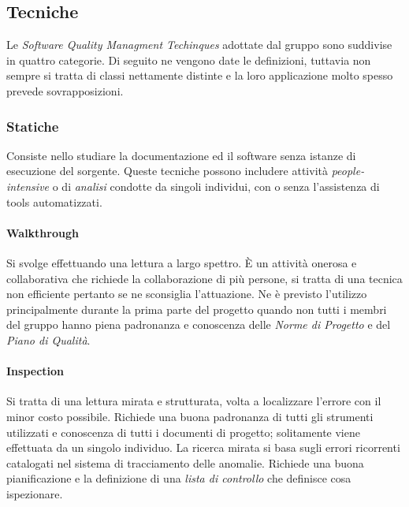 	\subsection{Tecniche}
	Le \emph{Software Quality Managment Techinques} adottate dal gruppo sono suddivise in quattro categorie. Di seguito ne vengono date le definizioni, tuttavia non sempre si tratta di classi nettamente distinte e la loro applicazione molto spesso prevede sovrapposizioni.
	
		\subsubsection{Statiche}
		Consiste nello studiare la documentazione ed il software senza istanze di esecuzione del sorgente. Queste tecniche possono includere attività \emph{people-intensive} o di \emph{analisi} condotte da singoli individui, con o senza l'assistenza di tools automatizzati.
			\paragraph{Walkthrough}
			Si svolge effettuando una lettura a largo spettro. È un attività onerosa e collaborativa che richiede la collaborazione di più persone, si tratta di una tecnica non efficiente pertanto se ne sconsiglia l'attuazione. Ne è previsto l'utilizzo principalmente durante la prima parte del progetto quando non tutti i membri del gruppo hanno piena padronanza e conoscenza delle \emph{Norme di Progetto} e del \emph{Piano di Qualità}.
			\paragraph{Inspection}
			Si tratta di una lettura mirata e strutturata, volta a localizzare l'errore con il minor costo possibile. Richiede una buona padronanza di tutti gli strumenti utilizzati e conoscenza di tutti i documenti di progetto; solitamente viene effettuata da un singolo individuo.
			La ricerca mirata si basa sugli errori ricorrenti catalogati nel sistema di tracciamento delle anomalie. Richiede una buona pianificazione e la definizione di una \emph{lista di controllo} che definisce cosa ispezionare.
			

